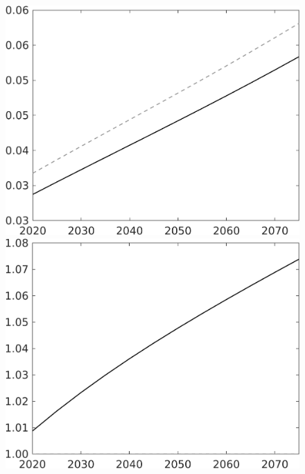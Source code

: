 \documentclass[12pt]{article}
\begin{document}
\begin{figure}[h!!]
\begin{minipage}[]{0.32\textwidth}
	\end{minipage}	
	\begin{minipage}[]{0.32\textwidth}
		\includegraphics[width=1\textwidth]{../../codding_model/own_basedOnFried/optimalPol_010922_revision/figures/all_13Sept22/CompTaul_Equlab_LFBAU_Reg0_G_spillover0_nsk1_xgr1_knspil1_sep1_countec0_GovRev0_etaa0.79_lgd0.png}
	\end{minipage}	
	\begin{minipage}[]{0.32\textwidth}
		\includegraphics[width=1\textwidth]{../../codding_model/own_basedOnFried/optimalPol_010922_revision/figures/all_13Sept22/CompTaul_Equlab_LFBAU_Reg0_lambdaa_spillover0_nsk1_xgr1_knspil1_sep1_countec0_GovRev0_etaa0.79_lgd0.png}

\end{minipage}
\end{figure}
\end{document}
